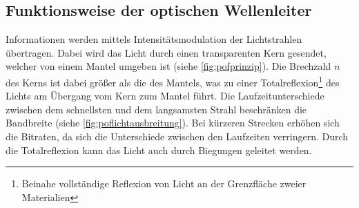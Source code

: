 \subsection{Funktionsweise der optischen Wellenleiter}
\label{subsec:poffunktionsweise}

Informationen werden mittels Intensitätsmodulation der Lichtstrahlen übertragen.
Dabei wird das Licht durch einen transparenten Kern gesendet, welcher von einem
Mantel umgeben ist (siehe \autoref{fig:pofprinzip}). Die Brechzahl $n$ des
Kerns ist dabei größer als die des Mantels, was zu einer
Totalreflexion\footnote{Beinahe vollständige Reflexion von Licht an der
Grenzfläche zweier Materialien} des Lichts am Übergang vom Kern zum Mantel
führt. Die Laufzeitunterschiede zwischen dem schnellsten und dem langsamsten
Strahl beschränken die Bandbreite (siehe \autoref{fig:poflichtausbreitung}). Bei
kürzeren Strecken erhöhen sich die Bitraten, da sich die Unterschiede zwischen
den Laufzeiten verringern. Durch die Totalreflexion kann das Licht auch durch
Biegungen geleitet werden. \cite{pofacprinzip}

